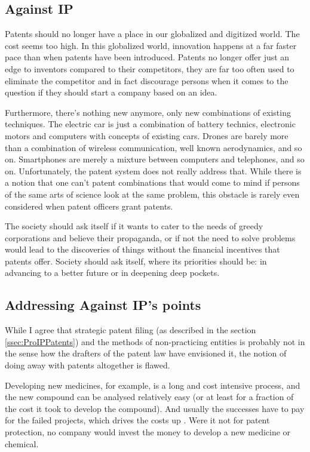 \documentclass[a4paper]{report}
\begin{document}
\subsection{Against IP}
Patents should no longer have a place in our globalized and digitized world. The cost seems too high. In this globalized world, innovation happens at a far faster pace than when patents have been introduced. Patents no longer offer just an edge to inventors compared to their competitors, they are far too often used to eliminate the competitor and in fact discourage persons when it comes to the question if they should start a company based on an idea.

Furthermore, there's nothing new anymore, only new combinations of existing techniques. The electric car is just a combination of battery technics, electronic motors and computers with concepts of existing cars. Drones are barely more than a combination of wireless communication, well known aerodynamics, and so on. Smartphones are merely a mixture between computers and telephones, and so on. Unfortunately, the patent system does not really address that. While there is a notion that one can't patent combinations that would come to mind if persons of the same arts of science look at the same problem, this obstacle is rarely even considered when patent officers grant patents.

The society should ask itself if it wants to cater to the needs of greedy corporations and believe their propaganda, or if not the need to solve problems would lead to the discoveries of things without the financial incentives that patents offer. Society should ask itself, where its priorities should be: in advancing to a better future or in deepening deep pockets.

\subsection{Addressing Against IP's points}
While I agree that strategic patent filing (as described in the section \ref{ssec:ProIPPatents}) and the methods of non-practicing entities is probably not in the sense how the drafters of the patent law have envisioned it, the notion of doing away with patents altogether is flawed. 

Developing new medicines, for example, is a long and cost intensive process, and the new compound can be analysed relatively easy (or at least for a fraction of the cost it took to develop the compound). And usually the successes have to pay for the failed projects, which drives the costs up \parencite{Herper2012}. Were it not for patent protection, no company would invest the money to develop a new medicine or chemical.
\end{document}
